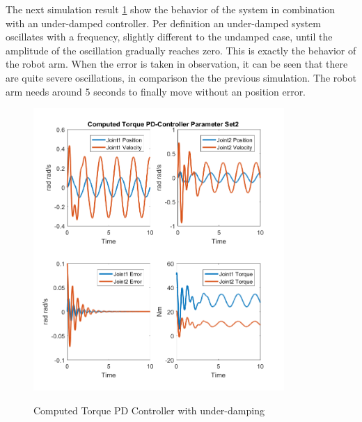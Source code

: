 The next simulation result \ref{fig:ct_pd2} show the behavior of the system in combination with an under-damped controller. Per definition an under-damped system oscillates with a frequency, slightly different to the undamped case, until the amplitude of the oscillation gradually reaches zero. This is exactly the behavior of the robot arm. When the error is taken in observation, it can be seen that there are quite severe oscillations, in comparison the the previous simulation. The robot arm needs around 5 seconds to finally move without an position error.\\
\begin{figure}[]
	\centering
	\includegraphics[width=0.85\textwidth]{pics/ComputedTorquePD-ControllerParameterSet2.png}\\
	\caption{Computed Torque PD Controller with under-damping}
	\label{fig:ct_pd2}
\end{figure}

